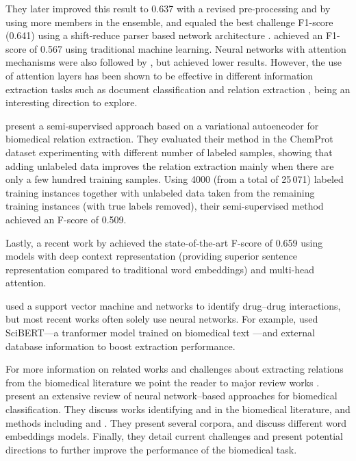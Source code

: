 They later improved this result to 0.637 with a revised pre-processing and by using more members in the ensemble, and equaled the best challenge F1-score (0.641) using a shift-reduce parser based network architecture \parencite{lim2018a}.
\textcite{lung2017a,lung2019a} achieved an F1-score of 0.567 using traditional machine learning.
Neural networks with attention mechanisms were also followed by \textcite{liu2017d,liu2018a,verga2017a}, but achieved lower results.
However, the use of attention layers \parencite{bahdanau2014a,vaswani2017a} has been shown to be effective in different information extraction tasks such as document classification \parencite{yang2016a} and relation extraction \parencite{shen2016a}, being an interesting direction to explore.

\textcite{zhang2019a} present a semi-supervised approach based on a variational autoencoder for biomedical relation extraction.
They evaluated their method in the ChemProt dataset experimenting with different number of labeled samples, showing that adding unlabeled data improves the relation extraction mainly when there are only a few hundred training samples.
Using 4000 (from a total of 25\,071) labeled training instances together with unlabeled data taken from the remaining training instances (with true labels removed), their semi-supervised method achieved an F-score of 0.509.

Lastly, a recent work by \textcite{zhang2019b} achieved the state-of-the-art F-score of 0.659 using  models with deep context representation (providing superior sentence representation compared to traditional word embeddings) and multi-head attention.

\textcite{huang2017a} used a support vector machine and  networks to identify drug--drug interactions, but most recent works often solely use neural networks.
For example, \textcite{asada2021a} used SciBERT---a tranformer model trained on biomedical text \parencite{beltagy2019c}---and external database information to boost  extraction performance.

For more information on related works and challenges about extracting relations from the biomedical literature we point the reader to major review works \parencite{hirschman2002a,krallinger2005a,ananiadou2006a,huang2016a,zhang2019j,zhao2021a}.
\textcite{zhang2019j} present an extensive review of neural network--based approaches for biomedical  classification.
They discuss works identifying  and  in the biomedical literature, and methods including  and .
They present several corpora, and discuss different word embeddings models.
Finally, they detail current challenges and present potential directions to further improve the performance of the biomedical  task.


